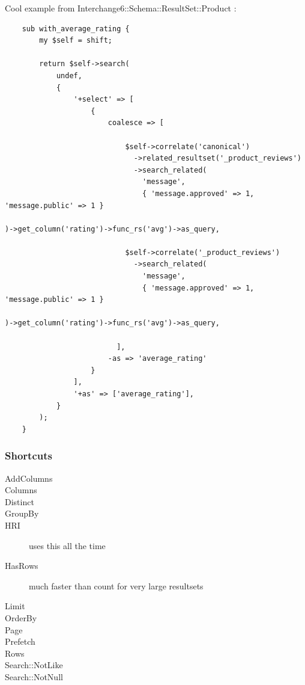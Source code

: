 Cool example from Interchange6::Schema::ResultSet::Product :

\begin{lstlisting}
    sub with_average_rating {
        my $self = shift;

        return $self->search(
            undef,
            {
                '+select' => [
                    {
                        coalesce => [

                            $self->correlate('canonical')
                              ->related_resultset('_product_reviews')
                              ->search_related(
                                'message',
                                { 'message.approved' => 1,
'message.public' => 1 }
                             
)->get_column('rating')->func_rs('avg')->as_query,

                            $self->correlate('_product_reviews')
                              ->search_related(
                                'message',
                                { 'message.approved' => 1,
'message.public' => 1 }
                             
)->get_column('rating')->func_rs('avg')->as_query,

                          ],
                        -as => 'average_rating'
                    }
                ],
                '+as' => ['average_rating'],
            }
        );
    }
\end{lstlisting}

\subsubsection{Shortcuts}
\begin{description}
\item[AddColumns] 
\item[Columns]
\item[Distinct]
\item[GroupBy] 
\item[HRI]
uses this all the time
\item[HasRows] much faster than count for very large resultsets
\item[Limit]
\item[OrderBy]
\item[Page]
\item[Prefetch]
\item[Rows]
\item[Search::{Not}Like]
\item[Search::{Not}Null] 
\end{description}

